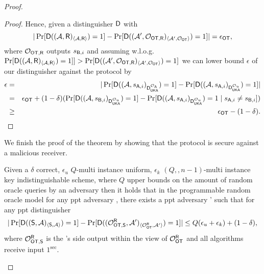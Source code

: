 \begin{proof}
\begin{proof}
Hence, given a distinguisher $\mathsf D$ with
$$
|\Pr[\mathsf D((\mathcal{A},\mathsf{R})_{\langle \mathcal{A}, \mathsf{R}\rangle})=1] -\Pr[ \mathsf D((\mathcal{A}',\mathcal{O}_{\mathsf{OT}, \mathsf{R}})_{\langle \mathcal{A}', \mathcal{O}_{\mathsf{OT}}\rangle})=1]|=\epsilon_{\mathsf{OT}},
$$
where $\mathcal{O}_{\mathsf{OT}, \mathsf{R}}$ outputs $s_{\mathsf{B},i}$
and assuming w.l.o.g. 
$
\Pr[\mathsf D((\mathcal{A},\mathsf{R})_{\langle \mathcal{A}, \mathsf{R}\rangle})=1]]>\Pr[  \mathsf D((\mathcal{A}',\mathcal{O}_{\mathsf{OT}, \mathsf{R}})_{\langle \mathcal{A}', \mathcal{O}_{\mathsf{OT}}\rangle})=1]
$
 we can lower bound $\epsilon$ of our distinguisher against the \UKA protocol by
\begin{eqnarray*}
\epsilon &=&|\Pr[\mathsf D((\mathcal{A},s_{\mathsf{A},i})_{\mathsf D_{\mathsf{UKA}}^{\mathcal{O}_{\mathsf{A}}}})=1] -\Pr[ \mathsf D((\mathcal{A},s_{\mathsf{A},i})_{\mathsf D_{\mathsf{UKA}}^{\mathcal{O}_{u}}})=1]|\\
&=& \epsilon_{\mathsf{OT}} +(1-\delta)(\Pr[ \mathsf D((\mathcal{A},s_{\mathsf{B},i})_{\mathsf D_{\mathsf{UKA}}^{\mathcal{O}_{u}}})=1]-\Pr[ \mathsf D((\mathcal{A},s_{\mathsf{A},i})_{\mathsf D_{\mathsf{UKA}}^{\mathcal{O}_{u}}})=1\mid s_{\mathsf{A},i}\neq s_{\mathsf{B},i}])\\
&\geq &\epsilon_{\mathsf{OT}}-(1-\delta).
\end{eqnarray*}
\end{proof}

We finish the proof of the theorem by showing that the \OT protocol is secure against a malicious receiver.
\begin{claim}\label{claim:malreceiver}
Given a $\delta$ correct, $\epsilon_u$ $Q$-multi instance uniform, $\epsilon_k$ $(Q,,n-1)$-multi instance key indistinguishable  \UKA scheme, where $Q$ upper bounds on the amount of random oracle queries by an adversary then it holds that in the programmable random oracle model for any ppt adversary \Adv, there exists a ppt adversary \Adv' such that for any ppt distinguisher \D
$$
|\Pr[\mathsf D((\mathsf{S}, \mathcal{A})_{\langle \mathsf{S}, \mathcal{A}\rangle})=1] -\Pr[\mathsf D((\mathcal{O}_{\mathsf{OT},\mathsf{S}}^\mathsf{R},\mathcal{A}')_{\langle \mathcal{O}_{\mathsf{OT}}^\mathsf{R} , \mathcal{A}' \rangle})=1]|\leq Q(\epsilon_{u}+\epsilon_{k})+(1-\delta),
$$
where $\mathcal{O}_{\mathsf{OT},\mathsf{S}}^\mathsf{R}$ is  the \send's side output within the view of $\mathcal{O}_{\mathsf{OT}}^\mathsf{R}$ and all algorithms receive input $1^\sec$.
\end{claim}



\end{proof}
